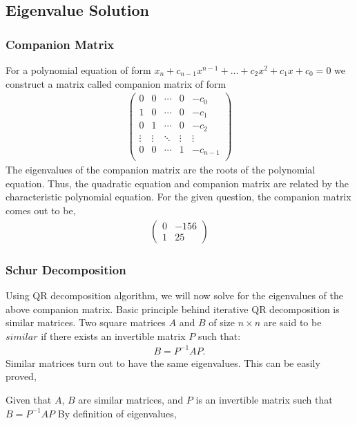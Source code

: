 \documentclass{beamer}
\theoremstyle{remark}
\newcommand{\myvec}[1]{\ensuremath{\begin{pmatrix}#1\end{pmatrix}}}
\numberwithin{equation}{section}
\begin{document}
    \subsection{Eigenvalue Solution}
    \begin{frame}
      \frametitle{Companion Matrix}
      For a polynomial equation of form $x_n+c_{n-1}x^{n-1}+\dots+c_2x^2+c_1x+c_0 = 0$ we construct a matrix called companion matrix of form
      {\small
      \begin{align}
        \myvec{
          0 & 0 & \cdots & 0 & -c_0\\
          1 & 0 & \cdots & 0 & -c_1\\
          0 & 1 & \cdots & 0 & -c_2\\
          \vdots & \vdots & \ddots & \vdots & \vdots\\
          0 & 0 & \cdots & 1 & -c_{n-1}\\
        }
      \end{align}}
      The eigenvalues of the companion matrix are the roots of the polynomial equation. Thus, the quadratic equation and companion matrix are related by the characteristic polynomial equation. For the given question, the companion matrix comes out to be,
      {\small
      \begin{align}
        \myvec{0 & -156 \\ 1 & 25}
      \end{align}
      }
    \end{frame}
    \begin{frame}
      \frametitle{Schur Decomposition}
      Using QR decomposition algorithm, we will now solve for the eigenvalues of the above companion matrix. \newline \newline Basic principle behind iterative QR decomposition is similar matrices.
      Two square matrices $A$ and $B$ of size $n \times n$ are said to be $similar$ if there exists an invertible matrix $P$ such that:
      \begin{align}
        B = P^{-1} A P.
      \end{align}
      Similar matrices turn out to have the same eigenvalues. This can be easily proved,

      Given that $A$, $B$ are similar matrices, and $P$ is an invertible matrix such that $B=P^{-1}AP$
      By definition of eigenvalues,
    \end{frame}
\end{document}
